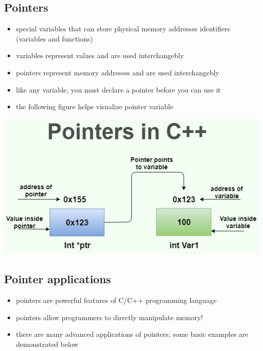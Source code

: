 \documentclass[11pt]{article}
\providecommand{\tightlist}{%
      \setlength{\itemsep}{0pt}\setlength{\parskip}{0pt}}
\begin{document}
    

    \hypertarget{pointers}{%
\subsection{Pointers}\label{pointers}}

\begin{itemize}
\tightlist
\item
  special variables that can store physical memory addresses identifiers
  (variables and functions)
\item
  variables represent values and are used interchangebly
\item
  pointers represent memory addresses and are used interchangebly
\item
  like any variable, you must declare a pointer before you can use it
\item
  the following figure helps visualize pointer variable
\end{itemize}

\includegraphics{resources/pointers-in-cpp.jpg}

    \hypertarget{pointer-applications}{%
\subsection{Pointer applications}\label{pointer-applications}}

\begin{itemize}
\tightlist
\item
  pointers are powerful features of C/C++ programming language
\item
  pointers allow programmers to directly manipulate memory!
\item
  there are many advanced applications of pointers; some basic examples
  are demonstrated below
\end{itemize}
\end{document}
